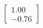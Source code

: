 \documentclass[preview]{standalone}
\begin{document}
\begin{align*}
\begin{bmatrix} 1.00 \\ -0.76 \end{bmatrix}
\end{align*}
\end{document}
